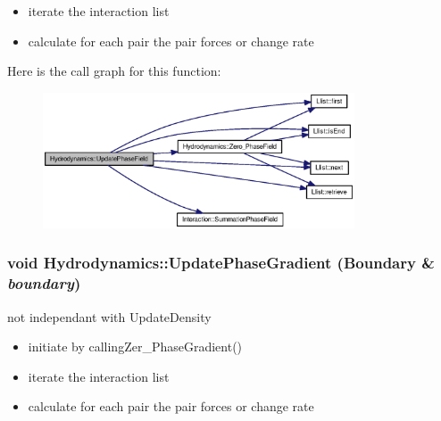 \begin{itemize}
\item iterate the interaction list\end{itemize}


\begin{itemize}
\item calculate for each pair the pair forces or change rate \end{itemize}


Here is the call graph for this function:\nopagebreak
\begin{figure}[H]
\begin{center}
\leavevmode
\includegraphics[width=262pt]{classHydrodynamics_c87ff6437d540454ed7de2f726858f4a_cgraph}
\end{center}
\end{figure}
\hypertarget{classHydrodynamics_939e9b2ec26b3e4a2eaf2683e5f0343d}{
\subsubsection[{UpdatePhaseGradient}]{\setlength{\rightskip}{0pt plus 5cm}void Hydrodynamics::UpdatePhaseGradient ({\bf Boundary} \& {\em boundary})}}
\label{classHydrodynamics_939e9b2ec26b3e4a2eaf2683e5f0343d}


not independant with UpdateDensity 



\begin{itemize}
\item initiate by callingZer\_\-PhaseGradient()\end{itemize}


\begin{itemize}
\item iterate the interaction list\end{itemize}


\begin{itemize}
\item calculate for each pair the pair forces or change rate \end{itemize}


